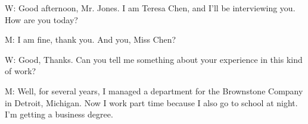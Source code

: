 \documentclass[12pt]{article}
\begin{document}
\vspace{0.00mm}

\vspace{0.00mm}
\setlength{\parindent}{0.00mm}
\setlength{\leftskip}{-6.23mm}
\setlength{\rightskip}{0.00mm}

W: Good afternoon, Mr. Jones. I am Teresa Chen, and I'll be interviewing you. How are you today?
\vspace{0.00mm}

\vspace{0.00mm}
\setlength{\parindent}{0.00mm}
\setlength{\leftskip}{-6.23mm}
\setlength{\rightskip}{0.00mm}


\vspace{0.00mm}

\vspace{0.00mm}
\setlength{\parindent}{0.00mm}
\setlength{\leftskip}{-6.23mm}
\setlength{\rightskip}{0.00mm}

M: I am fine, thank you. And you, Miss Chen?
\vspace{0.00mm}

\vspace{0.00mm}
\setlength{\parindent}{0.00mm}
\setlength{\leftskip}{-6.23mm}
\setlength{\rightskip}{0.00mm}


\vspace{0.00mm}

\vspace{0.00mm}
\setlength{\parindent}{0.00mm}
\setlength{\leftskip}{-6.23mm}
\setlength{\rightskip}{0.00mm}

W: Good, Thanks. Can you tell me something about your experience in this kind of work?
\vspace{0.00mm}

\vspace{0.00mm}
\setlength{\parindent}{0.00mm}
\setlength{\leftskip}{-6.23mm}
\setlength{\rightskip}{0.00mm}


\vspace{0.00mm}

\vspace{0.00mm}
\setlength{\parindent}{0.00mm}
\setlength{\leftskip}{-6.23mm}
\setlength{\rightskip}{0.00mm}

M: Well, for several years, I managed a department for the Brownstone Company in Detroit, Michigan. Now I work part time because I also go to school at night. I'm getting a business degree.
\vspace{0.00mm}

\vspace{0.00mm}
\setlength{\parindent}{0.00mm}
\setlength{\leftskip}{-6.23mm}
\setlength{\rightskip}{0.00mm}
\end{document}
